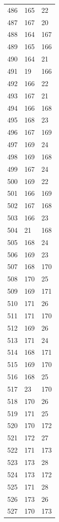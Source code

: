 \documentclass[a4paper,11pt]{article}
\begin{document}
\begin{center}
\begin{longtable}{|R{1.5cm}|R{1.5cm}|R{1.5cm}|}
  486 &  165 &   22 \\
  487 &  167 &   20 \\
  488 &  164 &  167 \\
  489 &  165 &  166 \\
  490 &  164 &   21 \\
  491 &   19 &  166 \\
  492 &  166 &   22 \\
  493 &  167 &   21 \\
  494 &  166 &  168 \\
  495 &  168 &   23 \\
  496 &  167 &  169 \\
  497 &  169 &   24 \\
  498 &  169 &  168 \\
  499 &  167 &   24 \\
  500 &  169 &   22 \\
  501 &  166 &  169 \\
  502 &  167 &  168 \\
  503 &  166 &   23 \\
  504 &   21 &  168 \\
  505 &  168 &   24 \\
  506 &  169 &   23 \\
  507 &  168 &  170 \\
  508 &  170 &   25 \\
  509 &  169 &  171 \\
  510 &  171 &   26 \\
  511 &  171 &  170 \\
  512 &  169 &   26 \\
  513 &  171 &   24 \\
  514 &  168 &  171 \\
  515 &  169 &  170 \\
  516 &  168 &   25 \\
  517 &   23 &  170 \\
  518 &  170 &   26 \\
  519 &  171 &   25 \\
  520 &  170 &  172 \\
  521 &  172 &   27 \\
  522 &  171 &  173 \\
  523 &  173 &   28 \\
  524 &  173 &  172 \\
  525 &  171 &   28 \\
  526 &  173 &   26 \\
  527 &  170 &  173 \\

\end{longtable}
\end{center}
\end{document}
